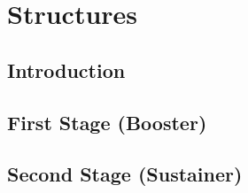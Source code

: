 \section{Structures} \label{section:structures}
\subsection{Introduction}
\subsection{First Stage (Booster)}
\subsection{Second Stage (Sustainer)}
